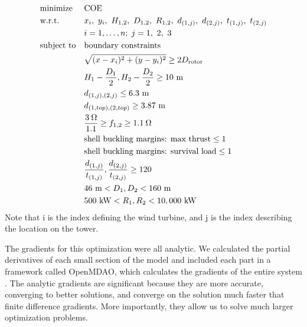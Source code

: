         \begin{equation}
			\begin{aligned}
				& \text{minimize}
					& & \text{COE} \\
                & \text{w.r.t.} 
                	&& x_i,~ y_i,~ H_{1,2},~ D_{1,2},~ R_{1,2},~ d_{(1,j)},~ d_{(2,j)},~ t_{(1,j)},~t_{(2,j)}\\
                		&&& i = 1, \ldots, n; \; j = 1,~2,~3 \\
				& \text{subject to}
					& & \text{boundary constraints} \\
						&&& \sqrt{(x-x_i)^2+(y-y_i)^2} \geq 2D_{\text{rotor}} \\
						&&& H_1-\frac{D_1}{2}, H_2-\frac{D_2}{2} \geq 10~ \text{m}\\
                		&&& d_{(1,j),(2,j)} \leq 6.3~ \text{m}\\
                		&&& d_{(1,top),(2,top)} \geq 3.87~ \text{m}\\
						&&& \frac{3\hspace{0.08cm}\Omega}{1.1} \geq f_{1,2} \geq 1.1\hspace{0.08cm}\Omega \\
                		&&& \text{shell buckling margins: max thrust} \leq 1 \\
                        &&& \text{shell buckling margins: survival load} \leq 1 \\
                		&&& \frac{d_{(1,j)}}{t_{(1,j)}},\frac{d_{(2,j)}}{t_{(2,j)}} \geq 120\\
                        &&& 46~ \text{m} < D_1,D_2 < 160~ \text{m}  \\
                        &&& 500~ \text{kW} < R_1,R_2 < 10,000~ \text{kW} \\
			\end{aligned}
		\end{equation}
%
Note that i is the index defining the wind turbine, and j is the index describing the location on the tower.
        
        The gradients for this optimization were all analytic. We calculated the partial derivatives of each small section of the model and included each part in a framework called OpenMDAO, which calculates the gradients of the entire system \citep{gray2010openmdao}. The analytic gradients are significant because they are more accurate, converging to better solutions, and converge on the solution much faster that finite difference gradients. More importantly, they allow us to solve much larger optimization problems. %
        
